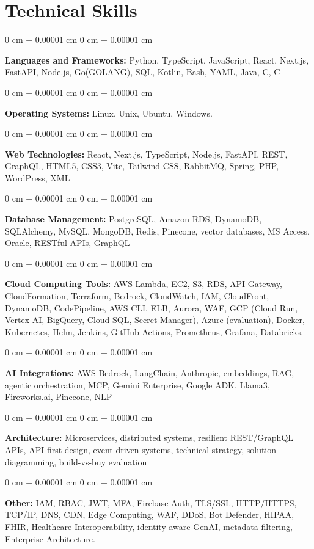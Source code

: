 \documentclass[10pt, letterpaper]{article}
\newenvironment{onecolentry}{
    \begin{adjustwidth}{
        0 cm + 0.00001 cm
    }{
        0 cm + 0.00001 cm
    }
}{
    \end{adjustwidth}
} %
\begin{document}
    \vspace{2 pt }

    \section{Technical Skills}
    \vspace{2 pt }
    \begin{onecolentry}
    \textbf{Languages and Frameworks:} Python, TypeScript, JavaScript, React, Next.js, FastAPI, Node.js, Go(GOLANG), SQL, Kotlin, Bash, YAML, Java, C, C++
    \end{onecolentry}
    \begin{onecolentry}
        \textbf{Operating Systems:} Linux, Unix, Ubuntu, Windows.
    \end{onecolentry}
    \begin{onecolentry}
         \textbf{Web Technologies:} React, Next.js, TypeScript, Node.js, FastAPI, REST, GraphQL, HTML5, CSS3, Vite, Tailwind CSS, RabbitMQ, Spring, PHP, WordPress, XML
    \end{onecolentry}
    \begin{onecolentry}
        \textbf{Database Management:} PostgreSQL, Amazon RDS, DynamoDB, SQLAlchemy, MySQL, MongoDB, Redis, Pinecone, vector databases, MS Access, Oracle, RESTful APIs, GraphQL
    \end{onecolentry}
    \begin{onecolentry}
        \textbf{Cloud Computing Tools:}
AWS Lambda, EC2, S3, RDS, API Gateway, CloudFormation, Terraform, Bedrock, CloudWatch, IAM, CloudFront, DynamoDB, CodePipeline, AWS CLI, ELB, Aurora, WAF, GCP (Cloud Run, Vertex AI, BigQuery, Cloud SQL, Secret Manager), Azure (evaluation), Docker, Kubernetes, Helm, Jenkins, GitHub Actions, Prometheus, Grafana, Databricks.
    \end{onecolentry}
    \begin{onecolentry}
         \textbf{AI Integrations:} AWS Bedrock, LangChain, Anthropic, embeddings, RAG, agentic orchestration, MCP, Gemini Enterprise, Google ADK, Llama3, Fireworks.ai, Pinecone, NLP
    \end{onecolentry}
    \begin{onecolentry}
        \textbf{Architecture:} Microservices, distributed systems, resilient REST/GraphQL APIs, API-first design, event-driven systems, technical strategy, solution diagramming, build-vs-buy evaluation
    \end{onecolentry}
        \begin{onecolentry}
     \textbf{Other:} IAM, RBAC, JWT, MFA, Firebase Auth, TLS/SSL, HTTP/HTTPS, TCP/IP, DNS, CDN, Edge Computing, WAF, DDoS, Bot Defender, HIPAA, FHIR, Healthcare Interoperability, identity-aware GenAI, metadata filtering, Enterprise Architecture.
    \end{onecolentry}
\end{document}
